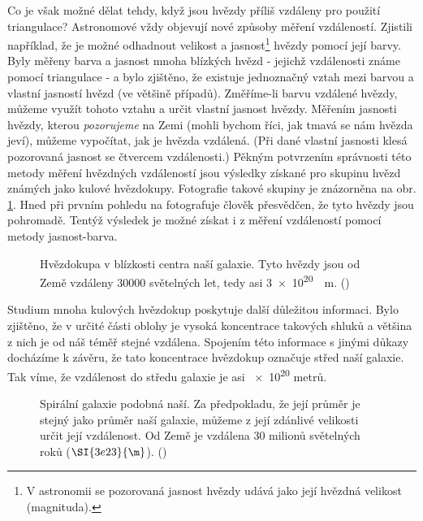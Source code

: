     Co je však možné dělat tehdy, když jsou hvězdy příliš vzdáleny pro použití triangulace? 
    Astronomové vždy objevují nové způsoby měření vzdáleností. Zjistili například, že je možné 
    odhadnout velikost a jasnost\footnote{V astronomii se pozorovaná jasnost hvězdy udává jako její 
    hvězdná velikost (magnituda).} hvězdy pomocí její barvy. Byly měřeny barva a jasnost mnoha 
    blízkých hvězd - jejichž vzdálenosti známe pomocí triangulace - a bylo zjištěno, že existuje 
    jednoznačný vztah mezi barvou a vlastní jasností hvězd (ve většině případů). Změříme-li barvu 
    vzdálené hvězdy, můžeme využít tohoto vztahu a určit vlastní jasnost hvězdy. Měřením jasnosti 
    hvězdy, kterou \emph{pozorujeme} na Zemi (mohli bychom říci, jak tmavá se nám hvězda jeví), 
    můžeme vypočítat, jak je hvězda vzdálená. (Při dané vlastní jasnosti klesá pozorovaná jasnost 
    se čtvercem vzdálenosti.) Pěkným potvrzením správnosti této metody měření hvězdných vzdáleností 
    jsou výsledky získané pro skupinu hvězd známých jako kulové hvězdokupy. Fotografie takové 
    skupiny je znázorněna na obr. \ref{fyz:fig0070}. Hned při prvním pohledu na fotografuje člověk 
    přesvědčen, že tyto hvězdy jsou pohromadě. Tentýž výsledek je možné získat i z měření 
    vzdáleností pomocí metody jasnost-barva.

    \begin{figure}[ht!]  %
      \centering
      \caption{Hvězdokupa v blízkosti centra naší galaxie. Tyto hvězdy jsou od Země vzdáleny
               \num{30000} světelných let, tedy asi \protect\SI{3e20}{\protect\m}.
               (\cite[s.~72]{Feynman01})}
      \label{fyz:fig0070}
    \end{figure}
    
    Studium mnoha kulových hvězdokup poskytuje další důležitou informaci. Bylo zjištěno, že v 
    určité části oblohy je vysoká koncentrace takových shluků a většina z nich je od náš téměř 
    stejné vzdálena. Spojením této informace s jinými důkazy docházíme k závěru, že tato 
    koncentrace hvězdokup označuje střed naší galaxie. Tak víme, že vzdálenost do středu galaxie je 
    asi \num{e20} metrů. 
    

    \begin{figure}[ht!]  %
      \centering
      \caption{Spirální galaxie podobná naší. Za předpokladu, že její průměr je stejný jako průměr 
               naší galaxie, můžeme z její zdánlivé velikosti určit její vzdálenost. Od Země je 
               vzdálena \num{30} milionů světelných roků (\protect\(\SI{3e23}{\protect\m}\)). 
               (\cite[s.~72]{Feynman01})}
      \label{fyz:fig0071}
    \end{figure}

